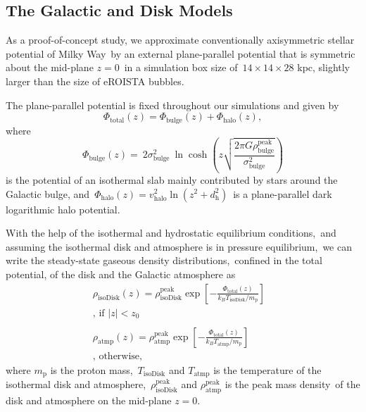 \documentclass[twocolumn]{aastex631}
\begin{document}
  \subsection{The Galactic and Disk Models}
  As a proof-of-concept study, we approximate conventionally axisymmetric stellar potential of Milky Way\
  by an external plane-parallel potential that is symmetric about the mid-plane $z=0$\
  in a simulation box size of\
  $14\times14\times28$ kpc, slightly larger than the size of eROISTA bubbles.

  The plane-parallel potential is fixed throughout our simulations and given by
  \begin{equation}
    \Phi_{\text{total}}(z) = \Phi_{\text{bulge}}(z) + \Phi_{\text{halo}}(z),
  \end{equation}
  where
  \begin{equation}
    \Phi_{\text{bulge}}(z)=\
    2\sigma^2_{\text{bulge}}\
    \ln\cosh\left(z\sqrt{\frac{2\pi G\rho_{\text{bulge}}^{\text{peak}}}{\sigma^2_{\text{bulge}}}}\right)
  \end{equation}
  is the potential of an isothermal slab mainly contributed by stars around the Galactic bulge, and\
  $\Phi_{\text{halo}}(z)=v^2_{\text{halo}}\ln\left(z^2+d^2_{\text{h}}\right)$\
  is a plane-parallel dark logarithmic halo potential.

  With the help of the isothermal and hydrostatic equilibrium conditions,\
  and assuming the isothermal disk and atmosphere is in pressure equilibrium,\
  we can write the steady-state gaseous density distributions,\
  confined in the total potential, of the disk and the Galactic atmosphere as\
  \begin{subequations}
  \begin{align}
     \displaystyle \rho_{\text{isoDisk}}(z) = \rho_{\text{isoDisk}}^{\text{peak}}
     \exp\left[-\frac{\Phi_{\text{total}}(z)}{k_{B}T_{\text{isoDisk}}/m_{\text{p}}}\right]&\label{isothermal-disk-density}\\
     \text{, if $|z| < z_{0}$}& \nonumber \\
     \nonumber\\
     \displaystyle \rho_{\text{atmp}}(z) = \rho_{\text{atmp}}^{\text{peak}}
     \exp\left[-\frac{\Phi_{\text{total}}(z)}{k_{B}T_{\text{atmp}}/m_{\text{p}}}\right]&\label{isothermal-atmp-density}\\
     \text{, otherwise,}& \nonumber
  \end{align}
  \label{disk-atm-sys}
  \end{subequations}
  where $m_{\text{p}}$ is the proton mass,\
  $T_{\text{isoDisk}}$ and $T_{\text{atmp}}$ is the temperature of the isothermal disk and atmosphere,\
  $\rho_{\text{isoDisk}}^{\text{peak}}$ and $\rho_{\text{atmp}}^{\text{peak}}$ is the peak mass density\
  of the disk and atmosphere on the mid-plane $z=0$.
\end{document}
